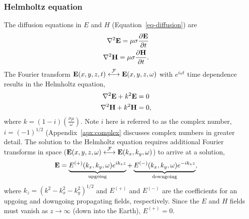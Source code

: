 \subsubsection{Helmholtz equation}
The diffusion equations in $E$ and $H$ (Equation~\ref{eq-diffusion}) are
\begin{align*}
    \nabla^2 \vb{E} = \mu \sigma \pdv{\vb{E}}{t} \\
    \nabla^2 \vb{H} = \mu \sigma \pdv{\vb{H}}{t}.
\end{align*}
The Fourier transform $\vb{E}(x,y,z,t)
\overset{\mathcal{F}}{\longleftrightarrow} \vb{E}(x,y,z,\omega)$ with $e^{i
\omega t}$ time dependence results in the Helmholtz equation,
\begin{align*}
    \nabla^2 \vb{E} + k^2 \vb{E} & = 0 \\
    \nabla^2 \vb{H} + k^2 \vb{H} & = 0, \\
\end{align*}
where $k = (1 - i) \left( \frac{\sigma \mu}{\omega} \right)$.  Note $i$ here is
referred to as the complex number, $i = (-1)^{1/2}$ (Appendix~\ref{apx:complex}
discusses complex numbers in greater detail.  The solution to the Helmholtz
equation requires additional Fourier transforms in space ($\vb{E}(x,y,z,\omega)
\overset{\mathcal{F}}{\longleftrightarrow} \vb{E}(k_x,k_y,\omega)$) to arrive at a
solution,
\begin{equation}
    \vb{E} = \underbrace{E^{(+)}(k_x,k_y,\omega) e^{i k_z z}}_{\mathrm{upgoing}}
        + \underbrace{E^{(-)}(k_x,k_y,\omega) e^{-i k_z z}}_{\mathrm{downgoing}}, 
\end{equation}
where $k_z = \left(k^2 - k_x^2 - k_y^2\right)^{1/2}$ and $E^{(+)}$ and $E^{(-)}$
are the coefficients for an upgoing and downgoing propagating fields,
respectively.  Since the $E$ and $H$ fields must vanish as $z \to \infty$ (down
into the Earth), $E^{(+)} = 0$.

